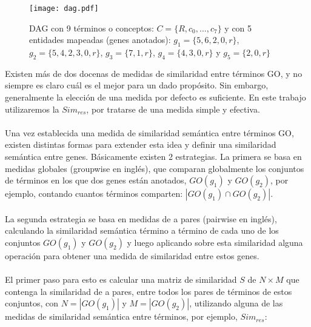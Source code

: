 \begin{figure}[h]
    \centering
    \texttt{[image: dag.pdf]}
    \caption{DAG con 9 términos o conceptos: $C=\{R, c_0,...,c_7\}$ y con 5 entidades mapeadas (genes anotados): $g_1=\{5, 6, 2, 0, r\}$, $g_2=\{5, 4, 2, 3, 0, r\}$, $g_3=\{7, 1, r\}$, $g_4=\{4, 3, 0, r\}$ y $g_5=\{2, 0, r\}$}
    \label{fig:dag}
\end{figure}
Existen más de dos docenas de medidas de similaridad entre términos GO, y no siempre es claro cuál es el mejor para un dado propósito. Sin embargo, generalmente la elección de una medida por defecto es suficiente\cite{Bose2016}. En este trabajo utilizaremos la $Sim_{res}$, por tratarse de una medida simple y efectiva.\\\\
Una vez establecida una medida de similaridad semántica entre términos GO, existen distintas formas para extender esta idea y definir una similaridad semántica entre genes. Básicamente existen 2
estrategias. La primera se basa en medidas globales (groupwise en inglés), que comparan globalmente los conjuntos de términos en los que dos genes están anotados, $GO(g_1)$ y $GO(g_2)$, por ejemplo, contando cuantos términos comparten: $|GO(g_1) \cap GO(g_2)|$.\cite{Lee2004} \\\\
La segunda estrategia se basa en medidas de a pares (pairwise en inglés), calculando la similaridad semántica término a término de cada uno de los conjuntos $GO(g_1)$ y $GO(g_2)$ y luego aplicando sobre esta similaridad alguna operación para obtener una medida de similaridad entre estos genes.\\\\
El primer paso para esto es calcular una matriz de similaridad $S$ de $N\times M$ que contenga la similaridad de a pares, entre todos los pares de términos de estos conjuntos, con $N=|GO(g_1)|$ y $M=|GO(g_2)|$, utilizando alguna de las medidas de similaridad semántica entre términos, por ejemplo, $Sim_{res}$:

